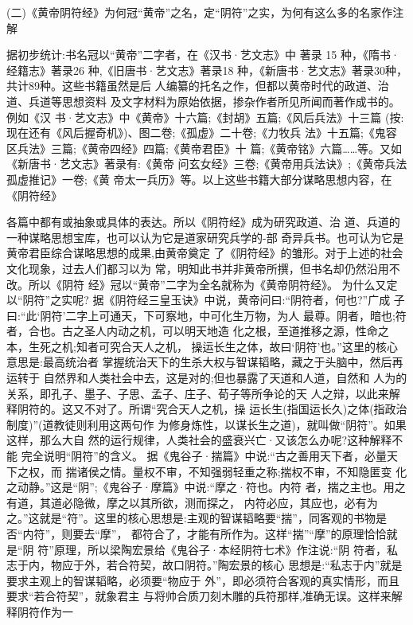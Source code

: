 \documentclass[12pt,UTF8]{ctexbook}
\begin{document}
(二)《黄帝阴符经》为何冠“黄帝”之名，定“阴符”之实，为何有这么多的名家作注解

据初步统计:书名冠以“黄帝”二字者，在《汉书·艺文志》中
著录 15 种，《隋书·经籍志》著录26 种,《旧唐书·艺文志》著录18
种，《新唐书·艺文志》著录30种，共计89种。这些书籍虽然是后
人编纂的托名之作，但都以黄帝时代的政道、治道、兵道等思想资料
及文字材料为原始依据，掺杂作者所见所闻而著作成书的。例如《汉
书·艺文志》中《黄帝》十六篇;《封胡》五篇;《风后兵法》十三篇
(按:现在还有《风后握奇机》)、图二卷;《孤虚》二十卷;《力牧兵
法》十五篇;《鬼容区兵法》三篇;《黄帝四经》四篇;《黄帝君臣》十
篇;《黄帝铭》六篇……等。又如《新唐书·艺文志》著录有:《黄帝
问玄女经》三卷;《黄帝用兵法诀》;《黄帝兵法孤虚推记》一卷;《黄
帝太一兵历》等。以上这些书籍大部分谋略思想内容，在《阴符经》

各篇中都有或抽象或具体的表达。所以《阴符经》成为研究政道、治
道、兵道的一种谋略思想宝库，也可以认为它是道家研究兵学的-部
奇异兵书。也可认为它是黄帝君臣综合谋略思想的成果,由黄帝奠定
了《阴符经》的雏形。对于上述的社会文化现象，过去人们都习以为
常，明知此书并非黄帝所撰，但书名却仍然沿用不改。所以《阴符
经》冠以“黄帝”二字为全名就称为《黄帝阴符经》。
为什么又定以“阴符”之实呢?
据《阴符经三皇玉诀》中说，黄帝问曰:“阴符者，何也?”广成
子曰:“此‘阴符’二字上可通天，下可察地，中可化生万物，为人
最尊。阴者，暗也;符者，合也。古之圣人内动之机，可以明天地造
化之根，至道推移之源，性命之本，生死之机;知者可究合天人之机，
操运长生之体，故曰‘阴符’也。”这里的核心意思是:最高统治者
掌握统治天下的生杀大权与智谋韬略，藏之于头脑中，然后再运转于
自然界和人类社会中去，这是对的;但也暴露了天道和人道，自然和
人为的关系，即孔子、墨子、子思、孟子、庄子、荀子等所争论的天
人之辩，以此来解释阴符的。这又不对了。所谓“究合天人之机，操
运长生(指国运长久)之体(指政治制度)”(道教徒则利用这两句作
为修身炼性，以谋长生之道)，就叫做“阴符”。如果这样，那么大自
然的运行规律，人类社会的盛衰兴亡·又该怎么办呢?这种解释不能
完全说明“阴符”的含义。
据《鬼谷子·揣篇》中说:“古之善用天下者，必量天下之权，而
揣诸侯之情。量权不审，不知强弱轻重之称;揣权不审，不知隐匿变
化之动静。”这是“阴”;《鬼谷子·摩篇》中说:“摩之·符也。内符
者，揣之主也。用之有道，其道必隐微，摩之以其所欲，测而探之，
内符必应，其应也，必有为之。”这就是“符”。这里的核心思想是:主观的智谋韬略要“揣”，同客观的书物是否“内符”，则要去“摩”，
都符合了，才能有所作为。这样“揣”“摩”的原理恰恰就是“阴
符”原理，所以梁陶宏景给《鬼谷子·本经阴符七术》作注说:“阴
符者，私志于内，物应于外，若合符契，故口阴符。”陶宏景的核心
思想是:“私志于内”就是要求主观上的智谋韬略，必须要“物应于
外”，即必须符合客观的真实情形，而且要求“若合符契”，就象君主
与将帅合质刀刻木雕的兵符那样,准确无误。这样来解释阴符作为一
\end{document}

